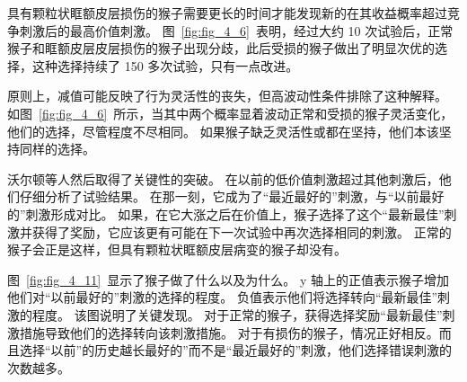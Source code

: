 具有颗粒状眶额皮层损伤的猴子需要更长的时间才能发现新的在其收益概率超过竞争刺激后的最高价值刺激。
图~\ref{fig:fig_4_6}~表明，经过大约 10 次试验后，正常猴子和眶额皮层皮层损伤的猴子出现分歧，此后受损的猴子做出了明显次优的选择，这种选择持续了 150 多次试验，只有一点改进。\par


原则上，减值可能反映了行为灵活性的丧失，但高波动性条件排除了这种解释。
如图~\ref{fig:fig_4_6}~所示，当其中两个概率显着波动正常和受损的猴子灵活变化，他们的选择，尽管程度不尽相同。
如果猴子缺乏灵活性或都在坚持，他们本该坚持同样的选择。\par


沃尔顿等人然后取得了关键性的突破。
在以前的低价值刺激超过其他刺激后，他们仔细分析了试验结果。
在那一刻，它成为了“最近最好的”刺激，与“以前最好的”刺激形成对比。
如果，在它大涨之后在价值上，猴子选择了这个“最新最佳”刺激并获得了奖励，它应该更有可能在下一次试验中再次选择相同的刺激。
正常的猴子会正是这样，但具有颗粒状眶额皮层病变的猴子却没有。\par


图~\ref{fig:fig_4_11}~显示了猴子做了什么以及为什么。
y 轴上的正值表示猴子增加他们对“以前最好的”刺激的选择的程度。
负值表示他们将选择转向“最新最佳”刺激的程度。
该图说明了关键发现。
对于正常的猴子，获得选择奖励“最新最佳”刺激措施导致他们的选择转向该刺激措施。
对于有损伤的猴子，情况正好相反。而且选择“以前”的历史越长最好的”而不是“最近最好的”刺激，他们选择错误刺激的次数越多。\par


